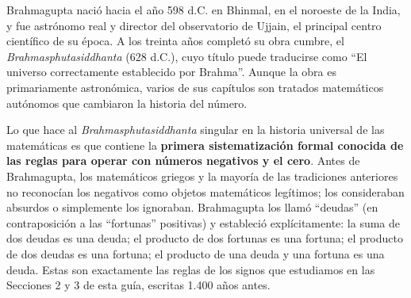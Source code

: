 \documentclass[11pt, letterpaper]{article}
\begin{document}
\begin{tcolorbox}[enhanced, breakable,
  colback=white, colframe=blockc, colbacktitle=blockc,
  coltitle=white, arc=4pt, leftrule=5pt,
  left=10pt, right=10pt, top=12pt, bottom=10pt,
  fonttitle=\bfseries,
  attach boxed title to top left={xshift=0.5cm, yshift*=-\tcboxedtitleheight/2},
  boxed title style={colframe=blockc, colback=blockc, arc=2pt},
  title={Brahmagupta \hfill \normalfont\itshape c.\,598 -- c.\,668 d.C.}]

\begin{minipage}[t]{0.78\linewidth}
\vspace{0pt}
Brahmagupta naci\'o hacia el a\~no 598 d.C. en Bhinmal, en el noroeste de la India, y fue astr\'onomo real y director del observatorio de Ujjain, el principal centro cient\'ifico de su \'epoca. A los treinta a\~nos complet\'o su obra cumbre, el \textit{Brahmasphutasiddhanta} (628 d.C.), cuyo t\'itulo puede traducirse como ``El universo correctamente establecido por Brahma''. Aunque la obra es primariamente astron\'omica, varios de sus cap\'itulos son tratados matem\'aticos aut\'onomos que cambiaron la historia del n\'umero.

\medskip
Lo que hace al \textit{Brahmasphutasiddhanta} singular en la historia universal de las matem\'aticas es que contiene la \textbf{primera sistematizaci\'on formal conocida de las reglas para operar con n\'umeros negativos y el cero}. Antes de Brahmagupta, los matem\'aticos griegos y la mayor\'ia de las tradiciones anteriores no reconoc\'ian los negativos como objetos matem\'aticos leg\'itimos; los consideraban absurdos o simplemente los ignoraban. Brahmagupta los llam\'o ``deudas'' (en contraposici\'on a las ``fortunas'' positivas) y estableci\'o expl\'icitamente: la suma de dos deudas es una deuda; el producto de dos fortunas es una fortuna; el producto de dos deudas es una fortuna; el producto de una deuda y una fortuna es una deuda. Estas son exactamente las reglas de los signos que estudiamos en las Secciones 2 y 3 de esta gu\'ia, escritas 1.400 a\~nos antes.


\end{minipage}
\end{tcolorbox}
\end{document}
